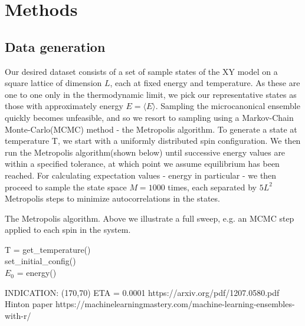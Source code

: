 \documentclass[]{article}
\begin{document}
\section{Methods}

\subsection{Data generation}
Our desired dataset consists of a set of sample states of the XY model on a square lattice of dimension $L$, each at fixed energy and temperature. As these are one to one only in the thermodynamic limit, we pick our representative states as those with approximately energy $E = \langle E \rangle$. Sampling the microcanonical ensemble quickly becomes unfeasible, and so we resort to sampling using a Markov-Chain Monte-Carlo(MCMC) method - the Metropolis algorithm. To generate a state at temperature T, we start with a uniformly distributed spin configuration. We then run the Metropolis algorithm(shown below) until successive energy values are within a specified tolerance, at which point we assume equilibrium has been reached. For calculating expectation values - energy in particular - we then proceed to sample the state space $M = 1000$ times, each separated by $5L^2$ Metropolis steps to minimize autocorrelations in the states.

\begin{algorithm}
	\caption{The Metropolis algorithm. Above we illustrate a full sweep, e.g. an MCMC step applied to each spin in the system.}
	
	T = get\_temperature()\\
	set\_initial\_config()\\
	$E_0$ = energy()\\

\end{algorithm} 
\vspace{5px}

INDICATION: (170,70) ETA = 0.0001
https://arxiv.org/pdf/1207.0580.pdf Hinton paper
https://machinelearningmastery.com/machine-learning-ensembles-with-r/
\end{document}
